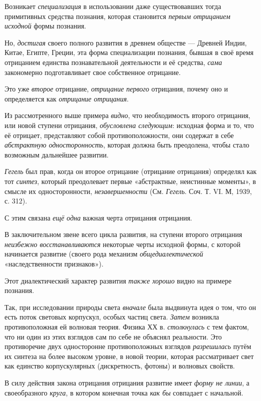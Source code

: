 \documentclass[a4paper,14pt,russian]{extreport}
\begin{document}
Возникает \emph{специализация} в использовании даже существовавших тогда примитивных средства познания, которая становится \emph{первым отрицанием исходной} формы познания.

Но, \emph{достигая} своего полного развития в древнем обществе --- Древней Индии, Китае, Египте, Греции, эта форма специализации познания, бывшая в своё время отрицанием единства познавательной деятельности и её средства, \emph{сама} закономерно подготавливает свое собственное отрицание.

Это уже \emph{второе} отрицание, \emph{отрицание первого} отрицания, почему оно и определяется как \emph{отрицание отрицания}.

Из рассмотренного выше примера \emph{видно}, что необходимость второго отрицания, или новой ступени отрицания, \emph{обусловлена следующим}: исходная форма и то, что её отрицает, представляют собой противоположности, они содержат в себе \emph{абстрактную односторонность}, которая должна быть преодолена, чтобы стало возможным дальнейшее развитии.

\emph{Гегель} был прав, когда он второе отрицание (отрицание отрицания) определял как тот \emph{синтез}, который преодолевает первые «абстрактные, неистинные моменты», в смысле их односторонности, \emph{незавершенности} (См. \emph{Гегель}. Соч. Т. VI. М, 1939, с. 312).

С этим связана \emph{ещё одна} важная черта отрицания отрицания.

В заключительном звене всего цикла развития, на ступени второго отрицания \emph{неизбежно восстанавливаются} некоторые черты исходной формы, с которой начинается развитие (своего рода механизм \emph{общедиалектической} «наследственности признаков»).

Этот диалектический характер развития \emph{также хорошо} видно на примере познания.

Так, при исследовании природы света \emph{вначале} была выдвинута идея о том, что он есть поток световых корпускул, особых частиц света. \emph{Затем} возникла противоположная ей волновая теория. Физика ХХ в. \emph{столкнулась} с тем фактом, что ни один из этих взглядов сам по себе не объяснял реальности. Это противоречие двух односторонне противоположных взглядов \emph{разрешилась} путём их синтеза на более высоком уровне, в новой теории, которая рассматривает свет как единство корпускулярных (дискретность, фотоны) и волновых свойств.

В силу действия закона отрицания отрицания развитие имеет \emph{форму не линии}, а своеобразного \emph{круга}, в котором конечная точка \emph{как бы} совпадает с начальной.
\end{document}
